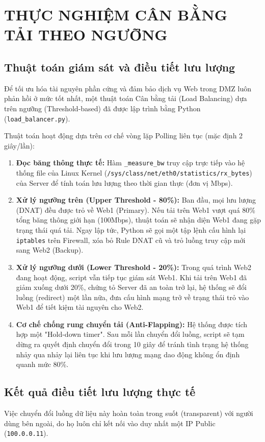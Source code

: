 \section{THỰC NGHIỆM CÂN BẰNG TẢI THEO NGƯỠNG}

\subsection{Thuật toán giám sát và điều tiết lưu lượng}
Để tối ưu hóa tài nguyên phần cứng và đảm bảo dịch vụ Web trong DMZ luôn phản hồi ở mức tốt nhất, một thuật toán Cân bằng tải (Load Balancing) dựa trên ngưỡng (Threshold-based) đã được lập trình bằng Python (\texttt{load\_balancer.py}).

Thuật toán hoạt động dựa trên cơ chế vòng lặp Polling liên tục (mặc định 2 giây/lần):
\begin{enumerate}
    \item \textbf{Đọc băng thông thực tế:} Hàm \texttt{\_measure\_bw} truy cập trực tiếp vào hệ thống file của Linux Kernel (\texttt{/sys/class/net/eth0/statistics/rx\_bytes}) của Server để tính toán lưu lượng theo thời gian thực (đơn vị Mbps).
    \item \textbf{Xử lý ngưỡng trên (Upper Threshold - 80\%):} Ban đầu, mọi lưu lượng (DNAT) đều được trỏ về Web1 (Primary). Nếu tải trên Web1 vượt quá 80\% tổng băng thông giới hạn (100Mbps), thuật toán sẽ nhận diện Web1 đang gặp trạng thái quá tải. Ngay lập tức, Python sẽ gọi một tập lệnh cấu hình lại \texttt{iptables} trên Firewall, xóa bỏ Rule DNAT cũ và trỏ luồng truy cập mới sang Web2 (Backup).
    \item \textbf{Xử lý ngưỡng dưới (Lower Threshold - 20\%):} Trong quá trình Web2 đang hoạt động, script vẫn tiếp tục giám sát Web1. Khi tải trên Web1 đã giảm xuống dưới 20\%, chứng tỏ Server đã an toàn trở lại, hệ thống sẽ đổi luồng (redirect) một lần nữa, đưa cấu hình mạng trở về trạng thái trỏ vào Web1 để tiết kiệm tài nguyên cho Web2.
    \item \textbf{Cơ chế chống rung chuyển tải (Anti-Flapping):} Hệ thống được tích hợp một "Hold-down timer". Sau mỗi lần chuyển đổi luồng, script sẽ tạm dừng ra quyết định chuyển đổi trong 10 giây để tránh tình trạng hệ thống nhảy qua nhảy lại liên tục khi lưu lượng mạng dao động không ổn định quanh mức 80\%.
\end{enumerate}

\subsection{Kết quả điều tiết lưu lượng thực tế}
Việc chuyển đổi luồng dữ liệu này hoàn toàn trong suốt (transparent) với người dùng bên ngoài, do họ luôn chỉ kết nối vào duy nhất một IP Public (\texttt{100.0.0.11}).

